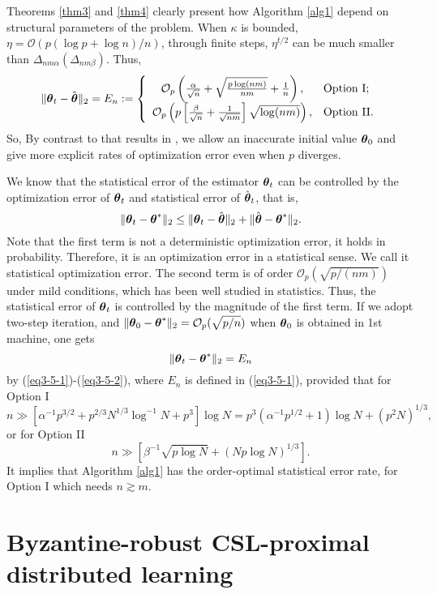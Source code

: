 \documentclass[12pt,a4paper]{article}%
\newcommand{\be}{\begin{equation}}
\newcommand{\ee}{\end{equation}}
\newcommand \vc[1]{{\mbox{\boldmath${#1}$}}}
\newcommand \vtheta{\vc \theta}
\numberwithin{equation}{section}
\newcommand{\sbr}[1]{\left(#1\right)}        %
\newcommand{\mbr}[1]{\left[#1\right]}        %
\begin{document}
Theorems \ref{thm3} and \ref{thm4} clearly present how Algorithm \ref{alg1} depend on structural parameters of the problem. When $\kappa$ is bounded, $\eta=\mathcal{O}(p(\log p+\log n)/n)$, through finite steps, $\eta^{t/2}$ can be much smaller than $\Delta_{nm\alpha} (\Delta_{nm\beta})$. Thus,
\be\label{eq3-5-1}
\|\vc\vtheta_t-\hat{\vtheta}\|_2=E_n
:=\left\{\begin{array}{cl}
         \mathcal{O}_p\sbr{\frac{\alpha}{\sqrt{n}}+\sqrt{\frac{p\log (nm)}{nm}}+\frac{1}{n}},  & \mathrm{Option~ I;} \\
          \mathcal{O}_p\sbr{p\mbr{\frac{\beta}{\sqrt{n}}+\frac{1}{\sqrt{nm}}}\sqrt{\log(nm)}}, & \mathrm{Option~ II.}
        \end{array}
 \right.
\ee
So, By contrast to that results in \cite{JordanLeeYang2019}, we allow an inaccurate initial value $\vtheta_0$ and give more explicit rates of optimization error even when $p$ diverges.

We know that the statistical error of the estimator $\vtheta_t$ can be controlled by the optimization error of $\vtheta_t$ and statistical error of $\hat{\vtheta}_t$, that is,
\be\label{eq3-5-2}
\|\vtheta_t-\vtheta^*\|_2\leq \|\vtheta_t-\hat{\vtheta}\|_2+\|\hat{\vtheta}-\vtheta^*\|_2.
\ee
Note that the first term is not a deterministic optimization error, it holds in probability. Therefore, it is an optimization error in a statistical sense. We call it statistical optimization error.
The second term is of order $\mathcal{O}_p(\sqrt{p/(nm)})$ under mild conditions, which has been well studied in statistics. Thus, the statistical error of $\vtheta_t$ is controlled by the magnitude of the first term. If we adopt two-step iteration, and $\|\vtheta_0-\vtheta^*\|_2=\mathcal{O}_p(\sqrt{p/n})$ when $\vtheta_0$ is obtained in 1st machine, one gets
$$\|\vtheta_t-\vtheta^*\|_2=E_n$$
by (\ref{eq3-5-1})-(\ref{eq3-5-2}), where $E_n$ is defined in (\ref{eq3-5-1}),
provided that for Option I
$$n\gg \mbr{\alpha^{-1}p^{3/2}+p^{2/3}N^{1/3}\log^{-1}N+p^3}\log N=p^3(\alpha^{-1}p^{1/2}+1)\log N+(p^2N)^{1/3},$$
 or for Option II
$$n\gg \mbr{\beta^{-1}\sqrt{p\log N}+(Np\log N)^{1/3}}.$$
{It implies that Algorithm \ref{alg1} has the order-optimal statistical error rate, for Option I which needs $n\gtrsim m$.}





\section{Byzantine-robust CSL-proximal distributed learning}\label{sec-BCSLp}
\end{document}
